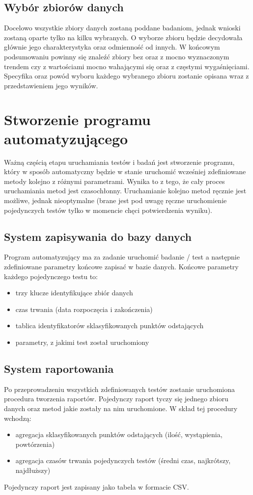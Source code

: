 \documentclass[eng,printmode]{mgr}
\begin{document}
\subsection{Wybór zbiorów danych}
Docelowo wszystkie zbiory danych zostaną poddane badaniom, jednak wnioski zostaną oparte tylko na kilku wybranych. O wyborze zbioru będzie decydowała głównie jego charakterystyka oraz odmienność od innych. W końcowym podsumowaniu powinny się znaleźć zbiory bez oraz z mocno wyznaczonym trendem czy z wartościami mocno wahającymi się oraz z częstymi wygaśnięciami.\\
Specyfika oraz powód wyboru każdego wybranego zbioru zostanie opisana wraz z przedstawieniem jego wyników.
\section{Stworzenie programu automatyzującego}
Ważną częścią etapu uruchamiania testów i badań jest stworzenie programu, który w sposób automatyczny będzie w stanie uruchomić wcześniej zdefiniowane metody kolejno z różnymi parametrami. Wynika to z tego, że cały proces uruchamiania metod jest czasochłonny. Uruchamianie kolejno metod ręcznie jest możliwe, jednak nieoptymalne (brane jest pod uwagę ręczne uruchomienie pojedynczych testów tylko w momencie chęci potwierdzenia wyniku). 

\subsection{System zapisywania do bazy danych}
Program automatyzujący ma za zadanie uruchomić badanie / test a następnie zdefiniowane parametry końcowe zapisać w bazie danych. Końcowe parametry każdego pojedynczego testu to:
\begin{itemize}
	\item trzy klucze identyfikujące zbiór danych
	\item czas trwania (data rozpoczęcia i zakończenia)
	\item tablica identyfikatorów sklasyfikowanych punktów odstających
	\item parametry, z jakimi test został uruchomiony
\end{itemize}

\subsection{System raportowania}
Po przeprowadzeniu wszystkich zdefiniowanych testów zostanie uruchomiona procedura tworzenia raportów. Pojedynczy raport tyczy się jednego zbioru danych oraz metod jakie zostały na nim uruchomione. W skład tej procedury wchodzą:
\begin{itemize}
	\item agregacja sklasyfikowanych punktów odstających (ilość, wystąpienia, powtórzenia)
	\item agregacja czasów trwania pojedynczych testów (średni czas, najkrótszy, najdłuższy)
\end{itemize}
Pojedynczy raport jest zapisany jako tabela w formacie CSV.
\end{document}

